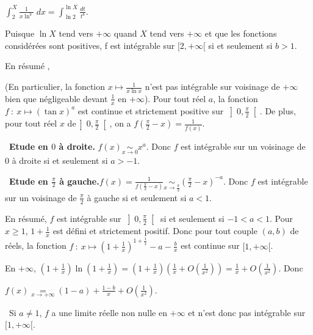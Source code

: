 {{\begin{center}
$\int_{2}^{X}\frac{1}{x\ln^b}\;dx=\int_{\ln2}^{\ln X}\frac{dt}{t^b}$.
\end{center}

Puisque $\ln X$ tend vers $+\infty$ quand $X$ tend vers $+\infty$ et que les fonctions considérées sont positives, f est intégrable sur $[2, +\infty[$ si et seulement si $b > 1$.

En résumé , 

\begin{center}
\fbox{
la fonction $x\mapsto\frac{1}{x^a\ln^bx}$ est intégrable sur $[2,+\infty[$ si et seulement si $a > 1$ ou ($a=1$ et $b > 1$).
}
\end{center}

(En particulier, la fonction $x\mapsto\frac{1}{x\ln x}$ n'est pas intégrable sur voisinage de $+\infty$ bien que négligeable devant $\frac{1}{x}$ en $+\infty$).
Pour tout réel $a$,  la fonction $f~:~x\mapsto(\tan x)^a$ est continue et strictement positive sur $\left]0,\frac{\pi}{2}\right[$. De plus, pour tout réel $x$ de$\left]0,\frac{\pi}{2}\right[$, on a $f\left(\frac{\pi}{2}-x\right) =\frac{1}{f(x)}$.

\textbullet~\textbf{Etude en $0$ à droite.} $f(x)\underset{x\rightarrow0}{\sim}x^a$. Donc $f$ est intégrable sur un voisinage de $0$ à droite si et seulement si $a > -1$.

\textbullet~\textbf{Etude en $\frac{\pi}{2}$ à gauche.}$f(x)=\frac{1}{f\left(\frac{\pi}{2}-x\right)}\underset{x\rightarrow\frac{\pi}{2}}{\sim}\left(\frac{\pi}{2}-x\right)^{-a}$. Donc $f$ est intégrable sur un voisinage de $\frac{\pi}{2}$ à gauche si et seulement si $a < 1$. 

En résumé, $f$ est intégrable sur $\left]0,\frac{\pi}{2}\right[$ si et seulement si $-1 < a < 1$.
Pour $x\geqslant1$, $1+\frac{1}{x}$ est défini et strictement positif. Donc pour tout couple $(a,b)$ de réels, la fonction $f~:~ x\mapsto\left(1+\frac{1}{x}\right)^{1+\frac{1}{x}}-a -\frac{b}{x}$  est continue sur $[1,+\infty[$.

En $+\infty$, $\left(1+\frac{1}{x}\right)\ln\left(1+\frac{1}{x}\right) =\left(1+\frac{1}{x}\right)\left(\frac{1}{x}+O\left(\frac{1}{x^2}\right)\right)=\frac{1}{x}+O\left(\frac{1}{x^2}\right)$. Donc 

\begin{center}
$f(x)\underset{x\rightarrow+\infty}{=}(1-a)+\frac{1-b}{x}+O\left(\frac{1}{x^2}\right)$.
\end{center}

\textbullet~Si $a\neq 1$, $f$ a une limite réelle non nulle en $+\infty$ et n'est donc pas intégrable sur $[1,+\infty[$.

}}
